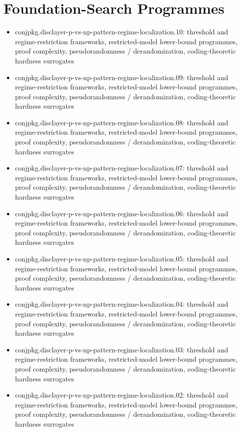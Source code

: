 \documentclass[11pt]{article}
\begin{document}
\section*{Foundation-Search Programmes}
\begin{itemize}
\item conjpkg.disclayer-p-vs-np-pattern-regime-localization.10: threshold and regime-restriction frameworks, restricted-model lower-bound programmes, proof complexity, pseudorandomness / derandomization, coding-theoretic hardness surrogates
\item conjpkg.disclayer-p-vs-np-pattern-regime-localization.09: threshold and regime-restriction frameworks, restricted-model lower-bound programmes, proof complexity, pseudorandomness / derandomization, coding-theoretic hardness surrogates
\item conjpkg.disclayer-p-vs-np-pattern-regime-localization.08: threshold and regime-restriction frameworks, restricted-model lower-bound programmes, proof complexity, pseudorandomness / derandomization, coding-theoretic hardness surrogates
\item conjpkg.disclayer-p-vs-np-pattern-regime-localization.07: threshold and regime-restriction frameworks, restricted-model lower-bound programmes, proof complexity, pseudorandomness / derandomization, coding-theoretic hardness surrogates
\item conjpkg.disclayer-p-vs-np-pattern-regime-localization.06: threshold and regime-restriction frameworks, restricted-model lower-bound programmes, proof complexity, pseudorandomness / derandomization, coding-theoretic hardness surrogates
\item conjpkg.disclayer-p-vs-np-pattern-regime-localization.05: threshold and regime-restriction frameworks, restricted-model lower-bound programmes, proof complexity, pseudorandomness / derandomization, coding-theoretic hardness surrogates
\item conjpkg.disclayer-p-vs-np-pattern-regime-localization.04: threshold and regime-restriction frameworks, restricted-model lower-bound programmes, proof complexity, pseudorandomness / derandomization, coding-theoretic hardness surrogates
\item conjpkg.disclayer-p-vs-np-pattern-regime-localization.03: threshold and regime-restriction frameworks, restricted-model lower-bound programmes, proof complexity, pseudorandomness / derandomization, coding-theoretic hardness surrogates
\item conjpkg.disclayer-p-vs-np-pattern-regime-localization.02: threshold and regime-restriction frameworks, restricted-model lower-bound programmes, proof complexity, pseudorandomness / derandomization, coding-theoretic hardness surrogates

\end{itemize}
\end{document}
